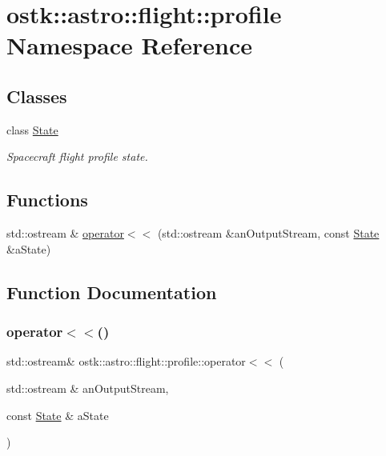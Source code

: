 \hypertarget{namespaceostk_1_1astro_1_1flight_1_1profile}{}\section{ostk\+:\+:astro\+:\+:flight\+:\+:profile Namespace Reference}
\label{namespaceostk_1_1astro_1_1flight_1_1profile}
\subsection*{Classes}
\begin{DoxyCompactItemize}
\item 
class \hyperlink{classostk_1_1astro_1_1flight_1_1profile_1_1_state}{State}
\begin{DoxyCompactList}\small\item\em Spacecraft flight profile state. \end{DoxyCompactList}\end{DoxyCompactItemize}
\subsection*{Functions}
\begin{DoxyCompactItemize}
\item 
std\+::ostream \& \hyperlink{namespaceostk_1_1astro_1_1flight_1_1profile_ac541dd34ecd497de53634c897e4f5a07}{operator$<$$<$} (std\+::ostream \&an\+Output\+Stream, const \hyperlink{classostk_1_1astro_1_1flight_1_1profile_1_1_state}{State} \&a\+State)
\end{DoxyCompactItemize}


\subsection{Function Documentation}
\mbox{\label{namespaceostk_1_1astro_1_1flight_1_1profile_ac541dd34ecd497de53634c897e4f5a07}} 
\subsubsection{\texorpdfstring{operator$<$$<$()}{operator<<()}}
{\footnotesize\ttfamily std\+::ostream\& ostk\+::astro\+::flight\+::profile\+::operator$<$$<$ (\begin{DoxyParamCaption}\item[{std\+::ostream \&}]{an\+Output\+Stream,  }\item[{const \hyperlink{classostk_1_1astro_1_1flight_1_1profile_1_1_state}{State} \&}]{a\+State }\end{DoxyParamCaption})}

